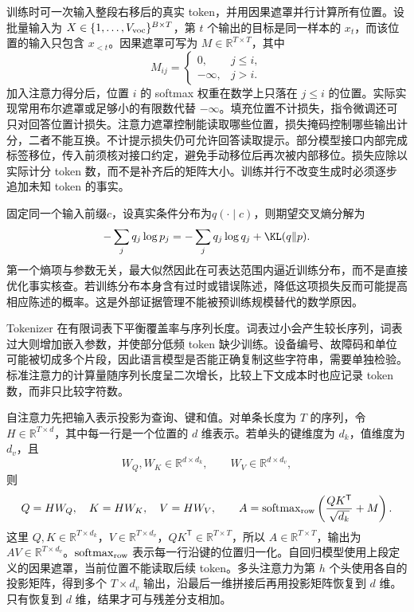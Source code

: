 训练时可一次输入整段右移后的真实 token，并用因果遮罩并行计算所有位置。设批量输入为 $X\in\{1,\ldots,V_{\rm voc}\}^{B\times T}$，第 $t$ 个输出的目标是同一样本的 $x_t$，而该位置的输入只包含 $x_{<t}$。因果遮罩可写为 $M\in\mathbb{R}^{T\times T}$，其中
\[
 M_{ij}=\begin{cases}0,&j\leq i,\\-\infty,&j>i.\end{cases}
\]
加入注意力得分后，位置 $i$ 的 softmax 权重在数学上只落在 $j\leq i$ 的位置。实际实现常用布尔遮罩或足够小的有限数代替 $-\infty$。填充位置不计损失，指令微调还可只对回答位置计损失。注意力遮罩控制能读取哪些位置，损失掩码控制哪些输出计分，二者不能互换。不计提示损失仍可允许回答读取提示。部分模型接口内部完成标签移位，传入前须核对接口约定，避免手动移位后再次被内部移位。损失应除以实际计分 token 数，而不是补齐后的矩阵大小。训练并行不改变生成时必须逐步追加未知 token 的事实。

固定同一个输入前缀$c$，设真实条件分布为$q(\cdot\mid c)$，则期望交叉熵分解为
\begin{equation}
 -\sum_jq_j\log p_j=-\sum_jq_j\log q_j+\KL(q\|p).
\end{equation}
第一个熵项与参数无关，最大似然因此在可表达范围内逼近训练分布，而不是直接优化事实核查。若训练分布本身含有过时或错误陈述，降低这项损失反而可能提高相应陈述的概率。这是外部证据管理不能被预训练规模替代的数学原因。

Tokenizer 在有限词表下平衡覆盖率与序列长度。词表过小会产生较长序列，词表过大则增加嵌入参数，并使部分低频 token 缺少训练。设备编号、故障码和单位可能被切成多个片段，因此语言模型是否能正确复制这些字符串，需要单独检验。标准注意力的计算量随序列长度呈二次增长，比较上下文成本时也应记录 token 数，而非只比较字符数。

自注意力先把输入表示投影为查询、键和值。对单条长度为 $T$ 的序列，令 $H\in\mathbb{R}^{T\times d}$，其中每一行是一个位置的 $d$ 维表示。若单头的键维度为 $d_k$，值维度为 $d_v$，且
\[
 W_Q,W_K\in\mathbb{R}^{d\times d_k},\qquad W_V\in\mathbb{R}^{d\times d_v},
\]
则
\begin{equation}
 Q=HW_Q,\quad K=HW_K,\quad V=HW_V,\qquad A=\operatorname{softmax}_{\rm row}\left(\frac{QK^{\mathsf T}}{\sqrt{d_k}}+M\right).
\end{equation}
这里 $Q,K\in\mathbb{R}^{T\times d_k}$，$V\in\mathbb{R}^{T\times d_v}$，$QK^{\mathsf T}\in\mathbb{R}^{T\times T}$，所以 $A\in\mathbb{R}^{T\times T}$，输出为 $AV\in\mathbb{R}^{T\times d_v}$。$\operatorname{softmax}_{\rm row}$ 表示每一行沿键的位置归一化。自回归模型使用上段定义的因果遮罩，当前位置不能读取后续 token。多头注意力为第 $h$ 个头使用各自的投影矩阵，得到多个 $T\times d_v$ 输出，沿最后一维拼接后再用投影矩阵恢复到 $d$ 维。只有恢复到 $d$ 维，结果才可与残差分支相加。

